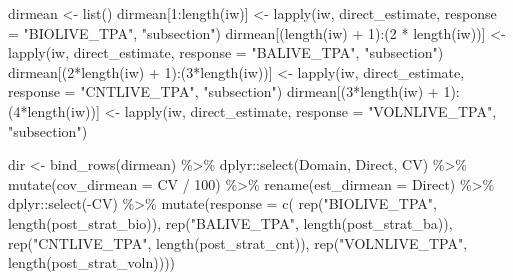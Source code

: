 \documentclass[12pt,twoside]{reedthesis}
\newenvironment{Shaded}{\begin{snugshade}}{\end{snugshade}}
\newcommand{\AttributeTok}[1]{\textcolor[rgb]{0.77,0.63,0.00}{#1}}
\newcommand{\DecValTok}[1]{\textcolor[rgb]{0.00,0.00,0.81}{#1}}
\newcommand{\FunctionTok}[1]{\textcolor[rgb]{0.00,0.00,0.00}{#1}}
\newcommand{\NormalTok}[1]{#1}
\newcommand{\OtherTok}[1]{\textcolor[rgb]{0.56,0.35,0.01}{#1}}
\newcommand{\SpecialCharTok}[1]{\textcolor[rgb]{0.00,0.00,0.00}{#1}}
\newcommand{\StringTok}[1]{\textcolor[rgb]{0.31,0.60,0.02}{#1}}
\begin{document}
\begin{Shaded}
\begin{Highlighting}[]
\NormalTok{dirmean }\OtherTok{\textless{}{-}} \FunctionTok{list}\NormalTok{()}
\NormalTok{dirmean[}\DecValTok{1}\SpecialCharTok{:}\FunctionTok{length}\NormalTok{(iw)] }\OtherTok{\textless{}{-}} 
  \FunctionTok{lapply}\NormalTok{(iw,}
\NormalTok{         direct\_estimate,}
         \AttributeTok{response =} \StringTok{"BIOLIVE\_TPA"}\NormalTok{, }
         \StringTok{"subsection"}\NormalTok{)}
\NormalTok{dirmean[(}\FunctionTok{length}\NormalTok{(iw) }\SpecialCharTok{+} \DecValTok{1}\NormalTok{)}\SpecialCharTok{:}\NormalTok{(}\DecValTok{2} \SpecialCharTok{*} \FunctionTok{length}\NormalTok{(iw))] }\OtherTok{\textless{}{-}} 
  \FunctionTok{lapply}\NormalTok{(iw,}
\NormalTok{        direct\_estimate,}
        \AttributeTok{response =} \StringTok{"BALIVE\_TPA"}\NormalTok{,}
        \StringTok{"subsection"}\NormalTok{)}
\NormalTok{dirmean[(}\DecValTok{2}\SpecialCharTok{*}\FunctionTok{length}\NormalTok{(iw) }\SpecialCharTok{+} \DecValTok{1}\NormalTok{)}\SpecialCharTok{:}\NormalTok{(}\DecValTok{3}\SpecialCharTok{*}\FunctionTok{length}\NormalTok{(iw))] }\OtherTok{\textless{}{-}} 
  \FunctionTok{lapply}\NormalTok{(iw,}
\NormalTok{         direct\_estimate,}
         \AttributeTok{response =} \StringTok{"CNTLIVE\_TPA"}\NormalTok{,}
         \StringTok{"subsection"}\NormalTok{)}
\NormalTok{dirmean[(}\DecValTok{3}\SpecialCharTok{*}\FunctionTok{length}\NormalTok{(iw) }\SpecialCharTok{+} \DecValTok{1}\NormalTok{)}\SpecialCharTok{:}\NormalTok{(}\DecValTok{4}\SpecialCharTok{*}\FunctionTok{length}\NormalTok{(iw))] }\OtherTok{\textless{}{-}} 
  \FunctionTok{lapply}\NormalTok{(iw,}
\NormalTok{         direct\_estimate,}
         \AttributeTok{response =} \StringTok{"VOLNLIVE\_TPA"}\NormalTok{,}
         \StringTok{"subsection"}\NormalTok{)}

\NormalTok{dir }\OtherTok{\textless{}{-}} \FunctionTok{bind\_rows}\NormalTok{(dirmean) }\SpecialCharTok{\%\textgreater{}\%}
\NormalTok{  dplyr}\SpecialCharTok{::}\FunctionTok{select}\NormalTok{(Domain, Direct, CV) }\SpecialCharTok{\%\textgreater{}\%}
  \FunctionTok{mutate}\NormalTok{(}\AttributeTok{cov\_dirmean =}\NormalTok{ CV }\SpecialCharTok{/} \DecValTok{100}\NormalTok{) }\SpecialCharTok{\%\textgreater{}\%}
  \FunctionTok{rename}\NormalTok{(}\AttributeTok{est\_dirmean =}\NormalTok{ Direct) }\SpecialCharTok{\%\textgreater{}\%}
\NormalTok{  dplyr}\SpecialCharTok{::}\FunctionTok{select}\NormalTok{(}\SpecialCharTok{{-}}\NormalTok{CV) }\SpecialCharTok{\%\textgreater{}\%}
  \FunctionTok{mutate}\NormalTok{(}\AttributeTok{response =} \FunctionTok{c}\NormalTok{(}
    \FunctionTok{rep}\NormalTok{(}\StringTok{"BIOLIVE\_TPA"}\NormalTok{, }\FunctionTok{length}\NormalTok{(post\_strat\_bio)),}
    \FunctionTok{rep}\NormalTok{(}\StringTok{"BALIVE\_TPA"}\NormalTok{, }\FunctionTok{length}\NormalTok{(post\_strat\_ba)),}
    \FunctionTok{rep}\NormalTok{(}\StringTok{"CNTLIVE\_TPA"}\NormalTok{, }\FunctionTok{length}\NormalTok{(post\_strat\_cnt)),}
    \FunctionTok{rep}\NormalTok{(}\StringTok{"VOLNLIVE\_TPA"}\NormalTok{, }\FunctionTok{length}\NormalTok{(post\_strat\_voln))))}


\end{Highlighting}
\end{Shaded}
\end{document}
